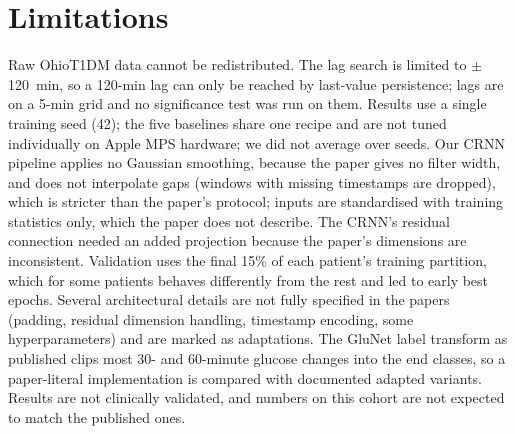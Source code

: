 \documentclass[conference]{IEEEtran}
\begin{document}
\section{Limitations}
Raw OhioT1DM data cannot be redistributed. The lag search is limited to $\pm$120~min, so a 120-min lag can only be reached by last-value persistence; lags are on a 5-min grid and no significance test was run on them. Results use a single training seed (42); the five baselines share one recipe and are not tuned individually on Apple MPS hardware; we did not average over seeds. Our CRNN pipeline applies no Gaussian smoothing, because the paper gives no filter width, and does not interpolate gaps (windows with missing timestamps are dropped), which is stricter than the paper's protocol; inputs are standardised with training statistics only, which the paper does not describe. The CRNN's residual connection needed an added projection because the paper's dimensions are inconsistent. Validation uses the final 15\% of each patient's training partition, which for some patients behaves differently from the rest and led to early best epochs. Several architectural details are not fully specified in the papers (padding, residual dimension handling, timestamp encoding, some hyperparameters) and are marked as adaptations. The GluNet label transform as published clips most 30- and 60-minute glucose changes into the end classes, so a paper-literal implementation is compared with documented adapted variants. Results are not clinically validated, and numbers on this cohort are not expected to match the published ones.
\end{document}
